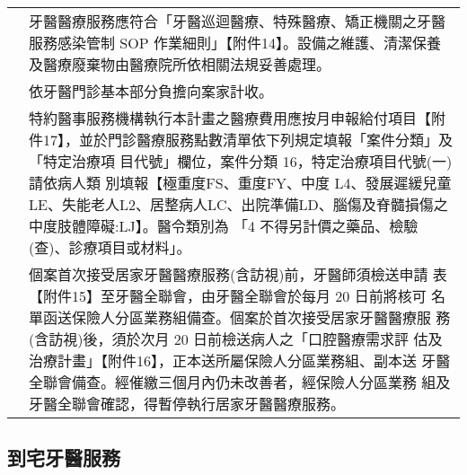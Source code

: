 \begin{longtable}{p{1.3in}p{4.8in}}
\color{OliveGreen}{感染管制}
& 牙醫醫療服務應符合「牙醫巡迴醫療、特殊醫療、矯正機關之牙醫服務感染管制 SOP 作業細則」【附件14】。設備之維護、清潔保養及醫療廢棄物由醫療院所依相關法規妥善處理。\\

\color{OliveGreen}{部分負擔}
& 依牙醫門診基本部分負擔向案家計收。\\

\color{OliveGreen}{醫療費用}
& 特約醫事服務機構執行本計畫之醫療費用應按月申報給付項目【附件17】，並於門診醫療服務點數清單依下列規定填報「案件分類」及「特定治療項 目代號」欄位，案件分類 16，特定治療項目代號(一)請依病人類 別填報【極重度FS、重度FY、中度 L4、發展遲緩兒童LE、失能老人L2、居整病人LC、出院準備LD、腦傷及脊髓損傷之中度肢體障礙:LJ】。醫令類別為
「4 不得另計價之藥品、檢驗(查)、診療項目或材料」。\\



\color{OliveGreen}{相關規範}
& 個案首次接受居家牙醫醫療服務(含訪視)前，牙醫師須檢送申請
表【附件15】至牙醫全聯會，由牙醫全聯會於每月 20 日前將核可 名單函送保險人分區業務組備查。個案於首次接受居家牙醫醫療服 務(含訪視)後，須於次月 20 日前檢送病人之「口腔醫療需求評 估及治療計畫」【附件16】，正本送所屬保險人分區業務組、副本送 牙醫全聯會備查。經催繳三個月內仍未改善者，經保險人分區業務 組及牙醫全聯會確認，得暫停執行居家牙醫醫療服務。



\end{longtable}


\subsection{到宅牙醫服務}


\setlength{\tabcolsep}{8pt}


